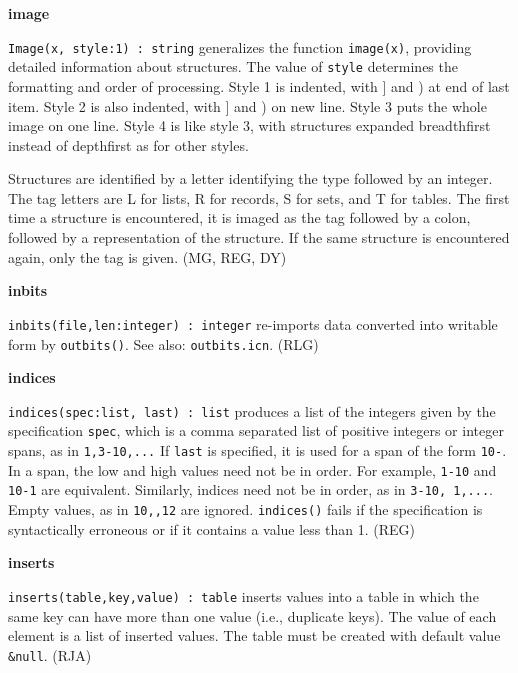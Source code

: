 {\sffamily\bfseries
image}

\texttt{Image(x, style:1) : string} generalizes the function
\texttt{image(x)}, providing detailed information about structures. The
value of \texttt{style} determines the formatting and order of
processing. Style 1 is indented, with ] and ) at end of last item.
Style 2 is also indented, with ] and ) on new line. Style 3 puts the
whole image on one line. Style 4 is like style 3, with structures
expanded breadthfirst instead of depthfirst as for other styles.

Structures are identified by a letter identifying the type followed by
an integer. The tag letters are {\textquotedbl}L{\textquotedbl} for
lists, {\textquotedbl}R{\textquotedbl} for records,
{\textquotedbl}S{\textquotedbl} for sets, and
{\textquotedbl}T{\textquotedbl} for tables. The first time a structure
is encountered, it is imaged as the tag followed by a colon, followed
by a representation of the structure. If the same structure is
encountered again, only the tag is given. (MG, REG, DY)

{\sffamily\bfseries
inbits}

\texttt{inbits(file,len:integer) : integer} re-imports data converted
into writable form by \texttt{outbits()}. See also:
\texttt{outbits.icn}. (RLG)

{\sffamily\bfseries
indices}

\texttt{indices(spec:list, last) : list} produces a list of the integers
given by the specification \texttt{spec}, which is a comma separated
list of positive integers or integer spans, as in
\texttt{{\textquotedbl}1,3-10,...{\textquotedbl}} If \texttt{last} is
specified, it is used for a span of the form
\texttt{{\textquotedbl}10-{\textquotedbl}}. In a span, the low and high
values need not be in order. For example,
\texttt{{\textquotedbl}1-10{\textquotedbl}} and
\texttt{{\textquotedbl}10-1{\textquotedbl}} are equivalent. Similarly,
indices need not be in order, as in \texttt{{\textquotedbl}3-10,
1,...{\textquotedbl}}. Empty values, as in
\texttt{{\textquotedbl}10,,12{\textquotedbl}} are ignored.
\texttt{indices()} fails if the specification is syntactically
erroneous or if it contains a value less than 1. (REG)

{\sffamily\bfseries
inserts}

\texttt{inserts(table,key,value) : table} inserts values into a table in
which the same key can have more than one value (i.e.,
duplicate keys). The value of each element is a
list of inserted values. The table must be created with default value
\texttt{\&null}. (RJA)


